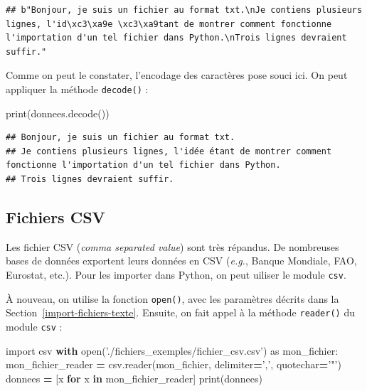 \documentclass[12pt,]{book}
\newenvironment{Shaded}{\begin{snugshade}}{\end{snugshade}}
\newcommand{\KeywordTok}[1]{\textcolor[rgb]{0.13,0.29,0.53}{\textbf{#1}}}
\newcommand{\StringTok}[1]{\textcolor[rgb]{0.31,0.60,0.02}{#1}}
\newcommand{\ImportTok}[1]{#1}
\newcommand{\ControlFlowTok}[1]{\textcolor[rgb]{0.13,0.29,0.53}{\textbf{#1}}}
\newcommand{\OperatorTok}[1]{\textcolor[rgb]{0.81,0.36,0.00}{\textbf{#1}}}
\newcommand{\BuiltInTok}[1]{#1}
\newcommand{\NormalTok}[1]{#1}
\numberwithin{equation}{section}
\numberwithin{countremarque}{section}
\begin{document}
\begin{lstlisting}
## b"Bonjour, je suis un fichier au format txt.\nJe contiens plusieurs lignes, l'id\xc3\xa9e \xc3\xa9tant de montrer comment fonctionne l'importation d'un tel fichier dans Python.\nTrois lignes devraient suffir."
\end{lstlisting}

Comme on peut le constater, l'encodage des caractères pose souci ici. On
peut appliquer la méthode \texttt{decode()} :

\begin{Shaded}
\begin{Highlighting}[]
\BuiltInTok{print}\NormalTok{(donnees.decode())}
\end{Highlighting}
\end{Shaded}

\begin{lstlisting}
## Bonjour, je suis un fichier au format txt.
## Je contiens plusieurs lignes, l'idée étant de montrer comment fonctionne l'importation d'un tel fichier dans Python.
## Trois lignes devraient suffir.
\end{lstlisting}

\subsection{Fichiers CSV}\label{importation-fichiers-csv}

Les fichier CSV (\emph{comma separated value}) sont très répandus. De
nombreuses bases de données exportent leurs données en CSV (\emph{e.g.},
Banque Mondiale, FAO, Eurostat, etc.). Pour les importer dans Python, on
peut uiliser le module \texttt{csv}.

À nouveau, on utilise la fonction \texttt{open()}, avec les paramètres
décrits dans la Section~\ref{import-fichiers-texte}. Ensuite, on fait
appel à la méthode \texttt{reader()} du module \texttt{csv} :

\begin{Shaded}
\begin{Highlighting}[]
\ImportTok{import}\NormalTok{ csv}
\ControlFlowTok{with} \BuiltInTok{open}\NormalTok{(}\StringTok{'./fichiers_exemples/fichier_csv.csv'}\NormalTok{) }\ImportTok{as}\NormalTok{ mon_fichier:}
\NormalTok{  mon_fichier_reader }\OperatorTok{=}\NormalTok{ csv.reader(mon_fichier, delimiter}\OperatorTok{=}\StringTok{','}\NormalTok{, quotechar}\OperatorTok{=}\StringTok{'"'}\NormalTok{)}
\NormalTok{  donnees }\OperatorTok{=}\NormalTok{ [x }\ControlFlowTok{for}\NormalTok{ x }\KeywordTok{in}\NormalTok{ mon_fichier_reader]}
\BuiltInTok{print}\NormalTok{(donnees)}
\end{Highlighting}
\end{Shaded}
\end{document}

